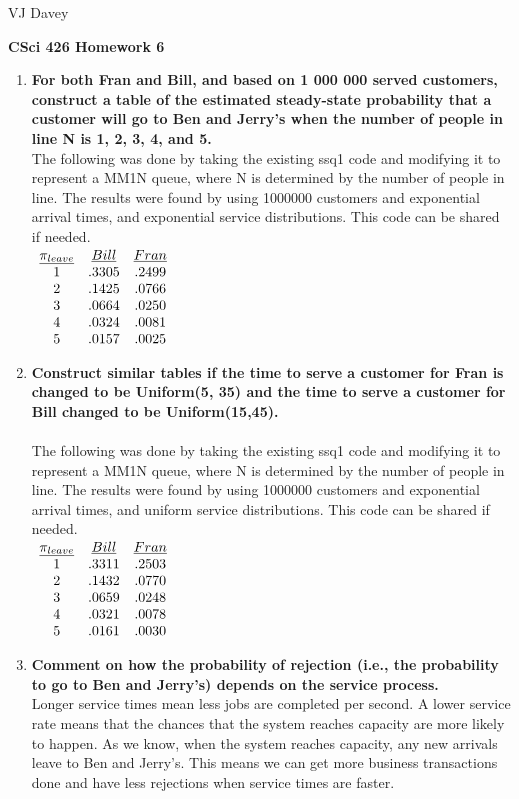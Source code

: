 \documentclass[11pt]{article}
\begin{document}
\centerline{VJ Davey}\vskip 0.10cm
\begin{LARGE}
\centerline {\bf CSci 426 Homework 6}
\end{LARGE}
\vskip 0.25cm
\begin{enumerate}
	\item\textbf{For both Fran and Bill, and based on 1 000 000 served customers, construct a table of the estimated steady-state probability that a customer will go to Ben and Jerry’s when the number of people in line N is 1, 2, 3, 4, and 5.}
	\\The following was done by taking the existing ssq1 code and modifying it to represent a MM1N queue, where N is determined by the number of people in line. The results were found by using 1000000 customers and exponential arrival times, and exponential service distributions. This code can be shared if needed.\\
	$\begin{array}{c c c}
	\underline{\pi_{leave}}&\underline{Bill}&\underline{Fran}\cr
	1&.3305& .2499\cr
	2&.1425& .0766\cr
	3&.0664& .0250\cr
	4&.0324& .0081\cr
	5&.0157& .0025\cr
	\end{array}$
	\item\textbf{Construct similar tables if the time to serve a customer for Fran is changed to be Uniform(5, 35) and the time to serve a customer for Bill changed to be Uniform(15,45).}
	\\\\The following was done by taking the existing ssq1 code and modifying it to represent a MM1N queue, where N is determined by the number of people in line. The results were found by using 1000000 customers and exponential arrival times, and uniform service distributions. This code can be shared if needed.\\
	$\begin{array}{c c c}
	\underline{\pi_{leave}}&\underline{Bill}&\underline{Fran}\cr
	1&.3311& .2503\cr
	2&.1432& .0770\cr
	3&.0659& .0248\cr
	4&.0321& .0078\cr
	5&.0161& .0030\cr
	\end{array}$
	\item\textbf{Comment on how the probability of rejection (i.e., the probability to go to Ben and Jerry’s) depends on the service process.}
	\\Longer service times mean less jobs are completed per second. A lower service rate means that the chances that the system reaches capacity are more likely to happen. As we know, when the system reaches capacity, any new arrivals leave to Ben and Jerry's. This means we can get more business transactions done and have less rejections when service times are faster.

\end{enumerate}
\end{document}
